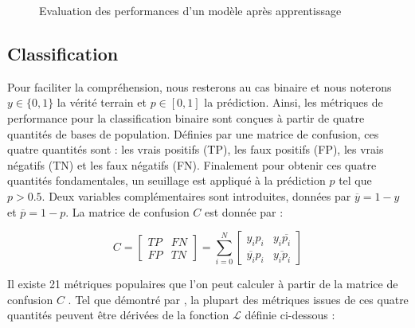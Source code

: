 \documentclass[../thesis.tex]{subfiles}
\begin{document}
    \begin{figure}[H]
        \centering
        
        \caption{Evaluation des performances d'un modèle après apprentissage}
        \label{fig:03-model-performances}
    \end{figure}
    
    
    \subsection{Classification}
    
    Pour faciliter la compréhension, nous resterons au cas binaire et nous noterons $y \in \{0,1\}$ la vérité terrain et $p \in [0,1]$ la prédiction. Ainsi, les métriques de performance pour la classification binaire sont conçues à partir de quatre quantités de bases de population. Définies par une matrice de confusion, ces quatre quantités sont : les vrais positifs (TP), les faux positifs (FP), les vrais négatifs (TN) et les faux négatifs (FN). Finalement pour obtenir ces quatre quantités fondamentales, un seuillage est appliqué à la prédiction $p$ tel que $p>0.5$.  Deux variables complémentaires sont introduites, données par $\overline{y} = 1-y$ et $\overline{p} = 1-p$. La matrice de confusion $C$ est donnée par :
    
    \vfill
    \begin{equation}
    C = 
    \begin{bmatrix}
    TP & FN \\[0.5em]
    FP & TN
    \end{bmatrix}
    = 
    \sum_{i=0}^N
    \begin{bmatrix}
    y_i  p_i            & y_i  \overline{p_i} \\[0.5em]
    \overline{y_i}  p_i & \overline{y_i p_i}
    \end{bmatrix}
    \end{equation}
    \vfill
    
    Il existe 21 métriques populaires que l'on peut calculer à partir de la matrice de confusion $C$ \cite{tharwat2020classification}. Tel que démontré par \cite{koyejo2014consistent}, la plupart des métriques issues de ces quatre quantités peuvent être dérivées de la fonction $\mathcal{L}$ définie ci-dessous :
    
\end{document}
